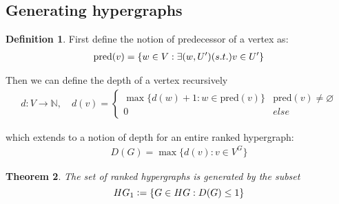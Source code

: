 \documentclass[12pt]{article}
\newtheorem{theorem}{Theorem}[section]
\theoremstyle{definition}
\newtheorem{definition}[theorem]{Definition}
\newcommand{\defeq}{\vcentcolon=}
\newcommand{\N}{\mathbb{N}}
\newcommand{\1}{\mathbbm{1}}
\newcommand{\pred}{\text{pred}}
\begin{document}
\subsection{Generating hypergraphs}

\begin{definition}
    First define the notion of predecessor of a vertex as:
    \begin{align*}
        \pred(v) = \{w\in V : \exists(w, U') \text( s.t. ) v\in U'\}
    \end{align*}

    Then we can define the depth of a vertex recursively
    \begin{align*}
        d: V \to \N, \quad d(v) = 
        \begin{cases}
            \max\{d(w) + 1 : w\in \pred(v)\} & \pred(v) \neq \varnothing\\
            0 & else 
        \end{cases}
    \end{align*}

    which extends to a notion of depth for an entire ranked hypergraph: \begin{align*}
        D(G) = \max\{d(v) : v\in V^G\}
    \end{align*}
\end{definition} %

\begin{theorem}
    The set of ranked hypergraphs is generated by the subset $$HG_1 \defeq \{G\in HG : D(G) \leq 1\}$$
\end{theorem} %
\end{document}
